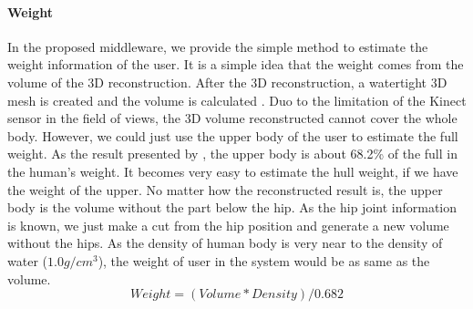 \paragraph{Weight}
In the proposed middleware, we provide the simple method to estimate the weight information of the user. It is a simple idea that the weight comes from the volume of the 3D reconstruction. After the 3D reconstruction, a watertight 3D mesh is created and the volume is calculated \cite{Qiao2015}.
Duo to the limitation of the Kinect sensor in the field of views, the 3D volume reconstructed cannot cover the whole body. However, we could just use the upper body of the user to estimate the full weight. As the result presented by \cite{Tozeren2000}, the upper body is about 68.2\% of the full in the human's weight. It becomes very easy to estimate the hull weight, if we have the weight of the upper. 
No matter how the reconstructed result is, the upper body is the volume without the part below the hip. As the hip joint information is known, we just make a cut from the hip position and generate a new volume without the hips.
As the density of human body is very near to the density of water ($1.0 g/cm^3$), the weight of user in the system would be as same as the volume.
\begin{equation}
Weight = (Volume * Density)/0.682
\end{equation}

